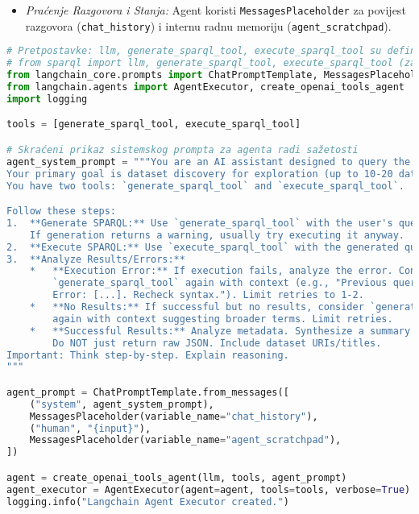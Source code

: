 \begin{itemize}
\begin{itemize}
\begin{enumerate}
        \end{enumerate}
        \item \textit{Praćenje Razgovora i Stanja:} Agent koristi \texttt{MessagesPlaceholder} za povijest razgovora (\texttt{chat\_history}) i internu radnu memoriju (\texttt{agent\_scratchpad}).
    \end{itemize}
\end{itemize}

\begin{lstlisting}[language=Python, caption=Postavljanje Langchain agenta i izvršitelja, label=lst:langchain_agent_setup_sparql_py, basicstyle=\footnotesize\ttfamily, breaklines=true, morekeywords={ChatPromptTemplate, MessagesPlaceholder, create_openai_tools_agent, AgentExecutor, logging}]
# Pretpostavke: llm, generate_sparql_tool, execute_sparql_tool su definirani
# from sparql import llm, generate_sparql_tool, execute_sparql_tool (za kontekst)
from langchain_core.prompts import ChatPromptTemplate, MessagesPlaceholder
from langchain.agents import AgentExecutor, create_openai_tools_agent
import logging

tools = [generate_sparql_tool, execute_sparql_tool]

# Skraćeni prikaz sistemskog prompta za agenta radi sažetosti
agent_system_prompt = """You are an AI assistant designed to query the EU Open Data Portal.
Your primary goal is dataset discovery for exploration (up to 10-20 datasets).
You have two tools: `generate_sparql_tool` and `execute_sparql_tool`.

Follow these steps:
1.  **Generate SPARQL:** Use `generate_sparql_tool` with the user's query.
    If generation returns a warning, usually try executing it anyway.
2.  **Execute SPARQL:** Use `execute_sparql_tool` with the generated query.
3.  **Analyze Results/Errors:**
    *   **Execution Error:** If execution fails, analyze the error. Consider using
        `generate_sparql_tool` again with context (e.g., "Previous query failed.
        Error: [...]. Recheck syntax."). Limit retries to 1-2.
    *   **No Results:** If successful but no results, consider `generate_sparql_tool`
        again with context suggesting broader terms. Limit retries.
    *   **Successful Results:** Analyze metadata. Synthesize a summary answer.
        Do NOT just return raw JSON. Include dataset URIs/titles.
Important: Think step-by-step. Explain reasoning.
"""

agent_prompt = ChatPromptTemplate.from_messages([
    ("system", agent_system_prompt),
    MessagesPlaceholder(variable_name="chat_history"),
    ("human", "{input}"),
    MessagesPlaceholder(variable_name="agent_scratchpad"),
])

agent = create_openai_tools_agent(llm, tools, agent_prompt)
agent_executor = AgentExecutor(agent=agent, tools=tools, verbose=True)
logging.info("Langchain Agent Executor created.")
\end{lstlisting}

